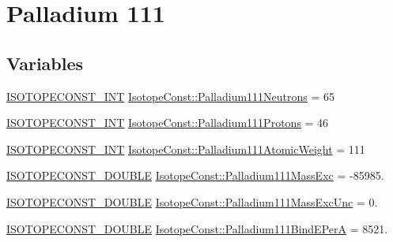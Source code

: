 \hypertarget{group___isotope_const-_palladium-_pd111}{}\section{Palladium 111}
\label{group___isotope_const-_palladium-_pd111}
\subsection*{Variables}
\begin{DoxyCompactItemize}
\item 
\mbox{\hyperlink{group___isotope_const-_macros_ga5f18360b3e99483a35c32d789e62621c}{I\+S\+O\+T\+O\+P\+E\+C\+O\+N\+S\+T\+\_\+\+I\+NT}} \mbox{\hyperlink{group___isotope_const-_palladium-_pd111_ga67d9eddb284d9c8eb1afb4ae3788d1b5}{Isotope\+Const\+::\+Palladium111\+Neutrons}} = 65
\item 
\mbox{\hyperlink{group___isotope_const-_macros_ga5f18360b3e99483a35c32d789e62621c}{I\+S\+O\+T\+O\+P\+E\+C\+O\+N\+S\+T\+\_\+\+I\+NT}} \mbox{\hyperlink{group___isotope_const-_palladium-_pd111_ga0da3865f9c43e44bf83485decbf8e1f6}{Isotope\+Const\+::\+Palladium111\+Protons}} = 46
\item 
\mbox{\hyperlink{group___isotope_const-_macros_ga5f18360b3e99483a35c32d789e62621c}{I\+S\+O\+T\+O\+P\+E\+C\+O\+N\+S\+T\+\_\+\+I\+NT}} \mbox{\hyperlink{group___isotope_const-_palladium-_pd111_gadb1aa4db7654e0a355166a95edc44838}{Isotope\+Const\+::\+Palladium111\+Atomic\+Weight}} = 111
\item 
\mbox{\hyperlink{group___isotope_const-_macros_ga8f45a7272ce02c0b4c65c44636ed719a}{I\+S\+O\+T\+O\+P\+E\+C\+O\+N\+S\+T\+\_\+\+D\+O\+U\+B\+LE}} \mbox{\hyperlink{group___isotope_const-_palladium-_pd111_ga09487abda8aacfae61f9cf79bc67228f}{Isotope\+Const\+::\+Palladium111\+Mass\+Exc}} = -\/85985.
\item 
\mbox{\hyperlink{group___isotope_const-_macros_ga8f45a7272ce02c0b4c65c44636ed719a}{I\+S\+O\+T\+O\+P\+E\+C\+O\+N\+S\+T\+\_\+\+D\+O\+U\+B\+LE}} \mbox{\hyperlink{group___isotope_const-_palladium-_pd111_gadc34ae1ae70b9141b49c4268f3358d2d}{Isotope\+Const\+::\+Palladium111\+Mass\+Exc\+Unc}} = 0.
\item 
\mbox{\hyperlink{group___isotope_const-_macros_ga8f45a7272ce02c0b4c65c44636ed719a}{I\+S\+O\+T\+O\+P\+E\+C\+O\+N\+S\+T\+\_\+\+D\+O\+U\+B\+LE}} \mbox{\hyperlink{group___isotope_const-_palladium-_pd111_gabf0fb7998588fcec4913673bb8bec860}{Isotope\+Const\+::\+Palladium111\+Bind\+E\+PerA}} = 8521.
\item 

\end{DoxyCompactItemize}
